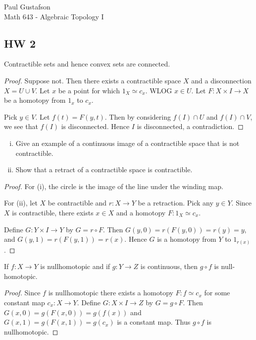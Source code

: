 \documentclass{article}
\begin{document}
\noindent Paul Gustafson\\
\noindent Math 643 - Algebraic Topology I

\subsection*{HW 2}
 Contractible sets and hence convex sets are connected. 
\begin{proof}
Suppose not.  Then there exists a contractible space $X$ and a disconnection $X = U \cup V$. Let $x$ be a point for which $1_X \simeq c_x$. WLOG $x \in U$. Let $F:X \times I \to X$ be a homotopy from $1_x$ to $c_x$. 

Pick $y \in V$. Let $f(t) = F(y,t)$. Then by considering $f(I) \cap U$ and $f(I) \cap V$, we see that $f(I)$ is disconnected.  Hence $I$ is disconnected, a contradiction.
\end{proof}

 \begin{enumerate}[(i)]
\item Give an example of a continuous image of a contractible space that is not contractible.
\item Show that a retract of a contractible space is contractible.
\end{enumerate}
\begin{proof}
For (i), the circle is the image of the line under the winding map.

For (ii), let $X$ be contractible and $r: X \to Y$ be a retraction. Pick any $y \in Y$. Since $X$ is contractible, there exists $x \in X$ and  a homotopy  $F:1_X \simeq c_x$. 

Define $G: Y \times I \to Y$ by $G = r \circ F$. Then $G(y, 0) = r(F(y, 0)) = r(y) = y$, and $G(y, 1) = r(F(y,1)) = r(x)$.  Hence $G$ is a homotopy from $Y$ to $1_{r(x)}$.
\end{proof}



 If $f: X \to Y$ is nullhomotopic and if $g: Y \to Z$ is continuous, then $g \circ f$ is 
null-homotopic.

\begin{proof}
Since $f$ is nullhomotopic there exists a homotopy $F:f \simeq c_x$ for some constant map $c_x:X \to Y$.  Define $G:X \times I \to Z$ by $G = g \circ F$. Then $G(x,0) = g(F(x,0)) = g(f(x))$ and $G(x,1) = g(F(x,1)) = g(c_x)$ is a constant map. Thus $g \circ f$ is nullhomotopic.
\end{proof}
\end{document}
